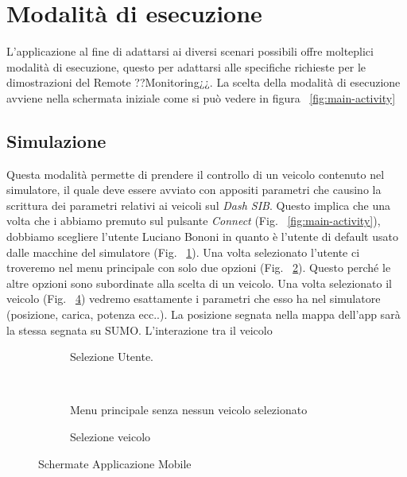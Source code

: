 \section{Modalità di esecuzione}

L'applicazione al fine di adattarsi ai diversi scenari possibili offre molteplici modalità di esecuzione, questo per adattarsi alle specifiche richieste per le dimostrazioni del Remote ??Monitoring¿¿. La scelta della modalità di esecuzione avviene nella schermata iniziale come si può vedere in figura ~\ref{fig:main-activity}

\subsection{Simulazione}

Questa modalità permette di prendere il controllo di un veicolo contenuto nel simulatore, il quale deve essere avviato con appositi parametri che causino la scrittura dei parametri relativi ai veicoli sul \emph{Dash SIB}. Questo implica che una volta che i abbiamo premuto sul pulsante \emph{Connect} (Fig. ~\ref{fig:main-activity}), dobbiamo scegliere l'utente Luciano Bononi in quanto è l'utente di default usato dalle macchine del simulatore (Fig. ~\ref{fig:select-user}). Una volta selezionato l'utente ci troveremo nel menu principale con solo due opzioni (Fig. ~\ref{fig:main-menu}). Questo perché le altre opzioni sono subordinate alla scelta di un veicolo. Una volta selezionato il veicolo (Fig. ~\ref{fig:select-veh}) vedremo esattamente i parametri che esso ha nel simulatore (posizione, carica, potenza ecc..). La posizione segnata nella mappa dell'app sarà la stessa segnata su SUMO. L'interazione tra il veicolo 

\begin{figure}[H]
        \centering
        \begin{subfigure}[H]{0.3\textwidth}
                \caption{Selezione Utente.}
                \label{fig:select-user}
        \end{subfigure}%
        ~ %
        \begin{subfigure}[H]{0.3\textwidth}
                \caption{Menu principale senza nessun veicolo selezionato}
                \label{fig:main-menu}
        \end{subfigure}
        \begin{subfigure}[H]{0.3\textwidth}
                \caption{Selezione veicolo}
                \label{fig:select-veh}
        \end{subfigure}
        \caption{Schermate Applicazione Mobile}
\end{figure}

